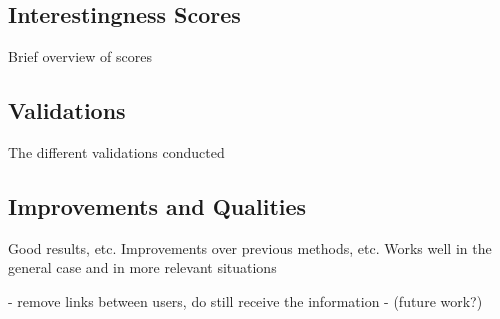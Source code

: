 \subsection{Interestingness Scores}
Brief overview of scores

\subsection{Validations}
The different validations conducted

\subsection{Improvements and Qualities}
Good results, etc.
Improvements over previous methods, etc.
Works well in the general case and in more relevant situations

- remove links between users, do still receive the information - (future work?)
